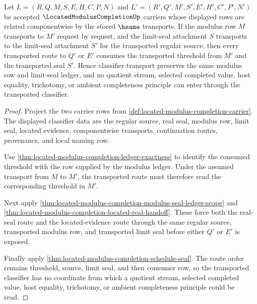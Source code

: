 \begin{theorem}
\label{thm:located-modulus-completion-classifier-ledger-seal}
Let $L=(R,Q,M,S,E,H,C,P,N)$ and $L'=(R',Q',M',S',E',H',C',P',N')$ be accepted $\LocatedModulusCompletionUp$ carriers whose displayed rows are related componentwise by the stored $\hsame$ transports. If the modulus row $M$ transports to $M'$ request by request, and the limit-seal attachment $S$ transports to the limit-seal attachment $S'$ for the transported regular source, then every transported route to $Q'$ or $E'$ consumes the transported threshold from $M'$ and the transported seal $S'$. Hence classifier transport preserves the same modulus row and limit-seal ledger, and no quotient stream, selected completed value, host equality, trichotomy, or ambient completeness principle can enter through the transported classifier.
\end{theorem}
\begin{proof}
Project the two carrier rows from \autoref{def:located-modulus-completion-carrier}. The displayed classifier data are the regular source, real seal, modulus row, limit seal, located evidence, componentwise transports, continuation routes, provenance, and local naming row.

Use \autoref{thm:located-modulus-completion-ledger-exactness} to identify the consumed threshold with the row supplied by the modulus ledger. Under the assumed transport from $M$ to $M'$, the transported route must therefore read the corresponding threshold in $M'$.

Next apply \autoref{thm:located-modulus-completion-modulus-seal-ledger-scope} and \autoref{thm:located-modulus-completion-located-real-handoff}. These force both the real-seal route and the located-evidence route through the same regular source, transported modulus row, and transported limit seal before either $Q'$ or $E'$ is exposed.

Finally apply \autoref{thm:located-modulus-completion-schedule-seal}. The route order remains threshold, source, limit seal, and then consumer row, so the transported classifier has no coordinate from which a quotient stream, selected completed value, host equality, trichotomy, or ambient completeness principle could be read.
\end{proof}

